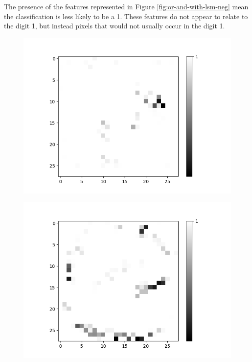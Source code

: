\noindent
\begin{minipage}[t]{0.5\textwidth}
	\vspace{0px}
	The presence of the features represented in Figure \ref{fig:or-and-with-lsm-neg} mean the classification is less likely to be a 1. These features do not appear to relate to the digit 1, but instead pixels that would not usually occur in the digit 1.\\
		
	\begin{figure}[H]	
		\centering
		\begin{minipage}[b]{0.32\textwidth}
			\captionsetup{labelformat=empty}
			\includegraphics[width=\textwidth]{OR-AND(W-LSM)(1)/DontLike/True/Layer0-Neuron-2.png}
			\label{}
		\end{minipage}
		\begin{minipage}[b]{0.32\textwidth}
			\captionsetup{labelformat=empty}
			\includegraphics[width=\textwidth]{OR-AND(W-LSM)(1)/DontLike/True/Layer0-Neuron-9.png}

\end{minipage}
\end{figure}
\end{minipage}
